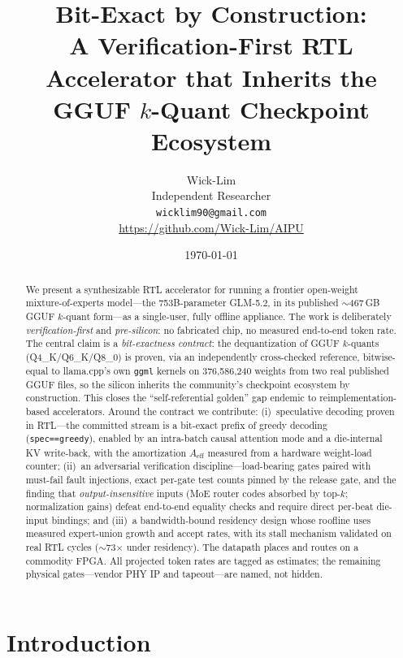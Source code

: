 \documentclass[11pt]{article}
\title{\textbf{Bit-Exact by Construction:\\
A Verification-First RTL Accelerator that Inherits the\\
GGUF $k$-Quant Checkpoint Ecosystem}}
\author{Wick-Lim\\
\small Independent Researcher\\
\small \texttt{wicklim90@gmail.com}\\
\small \url{https://github.com/Wick-Lim/AIPU}}
\date{\today}
\newcommand{\code}[1]{\texttt{#1}}
\begin{document}
\maketitle

\begin{abstract}
We present a synthesizable RTL accelerator for running a frontier open-weight
mixture-of-experts model---the 753B-parameter GLM-5.2, in its published
$\sim$467\,GB GGUF $k$-quant form---as a single-user, fully offline appliance.
The work is deliberately \emph{verification-first} and \emph{pre-silicon}: no
fabricated chip, no measured end-to-end token rate. The central claim is a
\emph{bit-exactness contract}: the dequantization of GGUF $k$-quants
(Q4\_K/Q6\_K/Q8\_0) is proven, via an independently cross-checked reference,
bitwise-equal to llama.cpp's own \code{ggml} kernels on 376{,}586{,}240 weights
from two real published GGUF files, so the silicon inherits the community's
checkpoint ecosystem by construction. This closes the ``self-referential
golden'' gap endemic to reimplementation-based accelerators. Around the
contract we contribute: (i)~speculative decoding proven in RTL---the committed
stream is a bit-exact prefix of greedy decoding (\code{spec==greedy}), enabled
by an intra-batch causal attention mode and a die-internal KV write-back, with
the amortization $A_{\mathrm{eff}}$ measured from a hardware weight-load
counter; (ii)~an adversarial verification discipline---load-bearing gates
paired with must-fail fault injections, exact per-gate test counts pinned by
the release gate, and the finding that \emph{output-insensitive} inputs (MoE
router codes absorbed by top-$k$; normalization gains) defeat end-to-end
equality checks and require direct per-beat die-input bindings; and (iii)~a
bandwidth-bound residency design whose roofline uses measured expert-union
growth and accept rates, with its stall mechanism validated on real RTL cycles
($\sim$73$\times$ under residency). The datapath places and routes on a
commodity FPGA. All projected token rates are tagged as estimates; the
remaining physical gates---vendor PHY IP and tapeout---are named, not hidden.
\end{abstract}

\section{Introduction}
\end{document}

